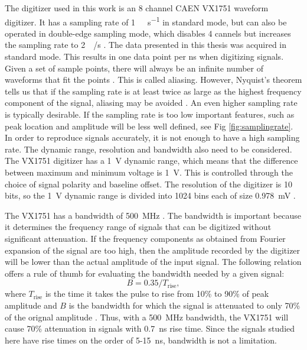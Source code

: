 \documentclass[main.tex]{subfiles}
\begin{document}
The digitizer used in this work is an 8 channel CAEN VX1751 waveform digitizer. It has a sampling rate of \si{1\giga\sample\per\second} in standard mode, but can also be operated in double-edge sampling mode, which disables 4 cannels but increases the sampling rate to \SI{2}{\giga\sample/\second} \cite{CAEN}. The data presented in this thesis was acquired in standard mode. This results in one data point per ns when digitizing signals. Given a set of sample points, there will always be an infinite number of waveforms that fit the points \cite{Spectrum}. This is called aliasing. However, Nyquist's theorem tells us that if the sampling rate is at least twice as large as the highest frequency component of the signal, aliasing may be avoided \cite{Spectrum}. An even higher sampling rate is typically desirable. If the sampling rate is too low important features, such as peak location and amplitude will be less well defined, see Fig \ref{fig:samplingrate}.
In order to reproduce signals accurately, it is not enough to have a high sampling rate. The dynamic range, resolution and bandwidth also need to be considered. 
The VX1751 digitizer has a \SI{1}{\volt} dynamic range, which means that the difference between maximum and minimum voltage is \SI{1}{\volt}. This is controlled through the choice of signal polarity and baseline offset. The resolution of the digitizer is 10 bits, so the \si{1\volt} dynamic range is divided into 1024 bins each of size \SI{0.978}{\milli\volt} \cite{CAEN}.

The VX1751 has a bandwidth of \SI{500}{\mega\hertz} \cite{CAEN}. The bandwidth is important because it determines the frequency range of signals that can be digitized without significant attenuation. If the frequency components as obtained from Fourier expansion of the signal are too high, then the amplitude recorded by the digitizer will be lower than the actual amplitude of the input signal. The following relation offers a rule of thumb for evaluating the bandwidth needed by a given signal:
\begin{equation}
\label{eq:bandwidth}
B=0.35/T_{\textrm{rise}},
\end{equation}
where $T_\textrm{rise}$ is the time it takes the pulse to rise from 10\% to 90\% of peak amplitude and $B$ is the bandwidth for which the signal is attenuated to only 70\% of the orignal amplitude \cite{Leo}. Thus, with a \SI{500}{MHz} bandwidth, the VX1751 will cause 70\% attenuation in signals with \SI{0.7}{ns} rise time. Since the signals studied here have rise times on the order of 5-\SI{15}{ns}, bandwidth is not a limitation.
\end{document}
